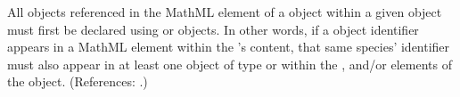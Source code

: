 All \Species objects referenced in the MathML  element of a
\KineticLaw object within a given \Reaction object must first be declared
using \SpeciesReference or \ModifierSpeciesReference objects.  In other
words, if a \Species object identifier appears in a MathML 
element within the \Reaction's \KineticLaw {} content, that same
species' identifier must also appear in at least one object of type
\SpeciesReference or \ModifierSpeciesReference within the
,  and/or
 elements of the \Reaction object.  (References:
.)

